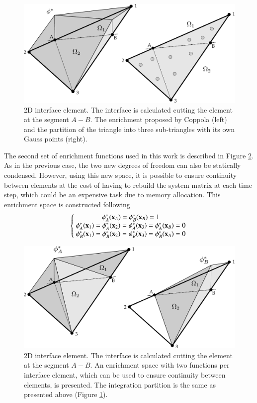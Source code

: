 \begin{figure}[H]
  \centering
  \includegraphics[width=.9\columnwidth]{images/enrichment1.pdf}
   \caption{2D interface element. The interface is calculated cutting the element at the segment $A-B$. The enrichment proposed by Coppola (left) and the partition of the triangle into three sub-triangles with its own Gauss points (right).}
   \label{fg:enrichment1}                %
\end{figure}

The second set of enrichment functions used in this work is described in Figure \ref{fg:enrichment2}. As in the previous case, the two new degrees of freedom can also be statically condensed. However, using this new space, it is possible to ensure continuity between elements at the cost of having to rebuild the system matrix at each time step, which could be an expensive task due to memory allocation.
This enrichment space is constructed following
\begin{equation}
   \left\{\;
   \begin{matrix}
     \phi_A^*(\mathbf{x}_A)=\phi_B^*(\mathbf{x}_B)=1 \\
     \phi_A^*(\mathbf{x}_1)=\phi_A^*(\mathbf{x}_2)=\phi_A^*(\mathbf{x}_3)=\phi_A^*(\mathbf{x}_B)=0 \\
     \phi_B^*(\mathbf{x}_1)=\phi_B^*(\mathbf{x}_2)=\phi_B^*(\mathbf{x}_3)=\phi_B^*(\mathbf{x}_A)=0
   \end{matrix}\;
   \right.
   \label{eq:enrich-2a}
\end{equation}

\begin{figure}[H]
  \centering
   \includegraphics[width=.9\columnwidth]{images/enrichment2.pdf}
   \caption{2D interface element. The interface is calculated cutting the element at the segment $A-B$. An enrichment space with two functions per interface element, which can be used to ensure continuity between elements, is presented. The integration partition is the same as presented above (Figure \ref{fg:enrichment1}).}
   \label{fg:enrichment2}
\end{figure}

